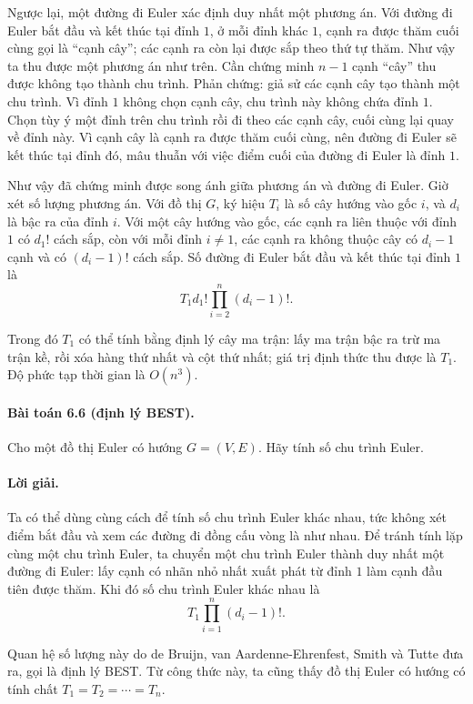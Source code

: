 \documentclass[11pt]{article}
\begin{document}
Ngược lại, một đường đi Euler xác định duy nhất một phương án. Với đường đi
Euler bắt đầu và kết thúc tại đỉnh \(1\), ở mỗi đỉnh khác \(1\), cạnh ra được
thăm cuối cùng gọi là ``cạnh cây''; các cạnh ra còn lại được sắp theo thứ tự
thăm. Như vậy ta thu được một phương án như trên. Cần chứng minh \(n-1\) cạnh
``cây'' thu được không tạo thành chu trình. Phản chứng: giả sử các cạnh cây tạo
thành một chu trình. Vì đỉnh \(1\) không chọn cạnh cây, chu trình này không
chứa đỉnh \(1\). Chọn tùy ý một đỉnh trên chu trình rồi đi theo các cạnh cây,
cuối cùng lại quay về đỉnh này. Vì cạnh cây là cạnh ra được thăm cuối cùng, nên
đường đi Euler sẽ kết thúc tại đỉnh đó, mâu thuẫn với việc điểm cuối của đường
đi Euler là đỉnh \(1\).

Như vậy đã chứng minh được song ánh giữa phương án và đường đi Euler. Giờ xét
số lượng phương án. Với đồ thị \(G\), ký hiệu \(T_i\) là số cây hướng vào gốc
\(i\), và \(d_i\) là bậc ra của đỉnh \(i\). Với một cây hướng vào gốc, các cạnh
ra liên thuộc với đỉnh \(1\) có \(d_1!\) cách sắp, còn với mỗi đỉnh
\(i\ne1\), các cạnh ra không thuộc cây có \(d_i-1\) cạnh và có \((d_i-1)!\)
cách sắp. Số đường đi Euler bắt đầu và kết thúc tại đỉnh \(1\) là
\[
  T_1 d_1!\prod_{i=2}^{n}(d_i-1)!.
\]

Trong đó \(T_1\) có thể tính bằng định lý cây ma trận: lấy ma trận bậc ra trừ
ma trận kề, rồi xóa hàng thứ nhất và cột thứ nhất; giá trị định thức thu được
là \(T_1\). Độ phức tạp thời gian là \(O(n^3)\).

\paragraph{Bài toán 6.6 (định lý BEST).}
Cho một đồ thị Euler có hướng \(G=(V,E)\). Hãy tính số chu trình Euler.

\paragraph{Lời giải.}
Ta có thể dùng cùng cách để tính số chu trình Euler khác nhau, tức không xét
điểm bắt đầu và xem các đường đi đồng cấu vòng là như nhau. Để tránh tính lặp
cùng một chu trình Euler, ta chuyển một chu trình Euler thành duy nhất một
đường đi Euler: lấy cạnh có nhãn nhỏ nhất xuất phát từ đỉnh \(1\) làm cạnh đầu
tiên được thăm. Khi đó số chu trình Euler khác nhau là
\[
  T_1\prod_{i=1}^{n}(d_i-1)!.
\]

Quan hệ số lượng này do de Bruijn, van Aardenne-Ehrenfest, Smith và Tutte đưa
ra, gọi là định lý BEST. Từ công thức này, ta cũng thấy đồ thị Euler có hướng
có tính chất \(T_1=T_2=\cdots=T_n\).
\end{document}
